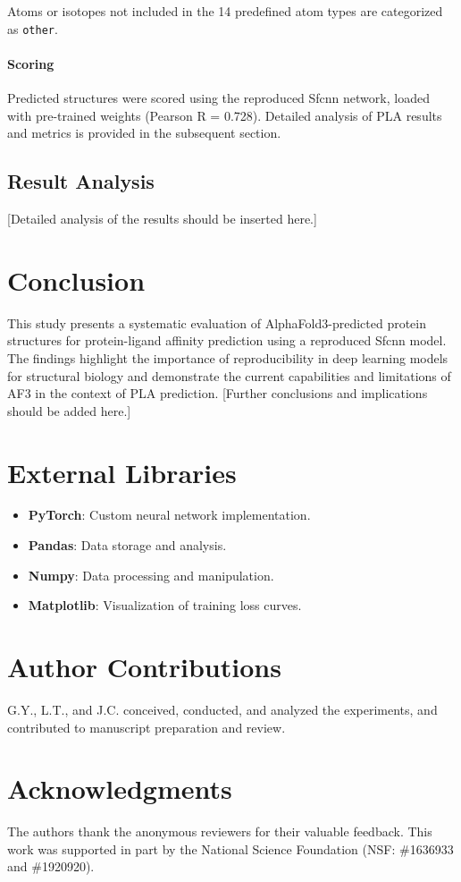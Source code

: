 \documentclass[unnumsec,webpdf,contemporary,large]{oup-authoring-template}
\theoremstyle{thmstyleone}%
\theoremstyle{thmstyletwo}%
\theoremstyle{thmstylethree}%
\begin{document}
Atoms or isotopes not included in the 14 predefined atom types are categorized as \texttt{other}.

\paragraph{Scoring}
Predicted structures were scored using the reproduced Sfcnn network, loaded with pre-trained weights (Pearson R = 0.728). Detailed analysis of PLA results and metrics is provided in the subsequent section.

\subsection{Result Analysis}
\vspace{0.5em}
[Detailed analysis of the results should be inserted here.]

\section{Conclusion}
This study presents a systematic evaluation of AlphaFold3-predicted protein structures for protein-ligand affinity prediction using a reproduced Sfcnn model. The findings highlight the importance of reproducibility in deep learning models for structural biology and demonstrate the current capabilities and limitations of AF3 in the context of PLA prediction. [Further conclusions and implications should be added here.]

\section{External Libraries}

\begin{itemize}
    \item \textbf{PyTorch}: Custom neural network implementation.
    \item \textbf{Pandas}: Data storage and analysis.
    \item \textbf{Numpy}: Data processing and manipulation.
    \item \textbf{Matplotlib}: Visualization of training loss curves.
\end{itemize}

\section{Author Contributions}
G.Y., L.T., and J.C. conceived, conducted, and analyzed the experiments, and contributed to manuscript preparation and review.

\section{Acknowledgments}
The authors thank the anonymous reviewers for their valuable feedback. This work was supported in part by the National Science Foundation (NSF: \#1636933 and \#1920920).



\end{document}
